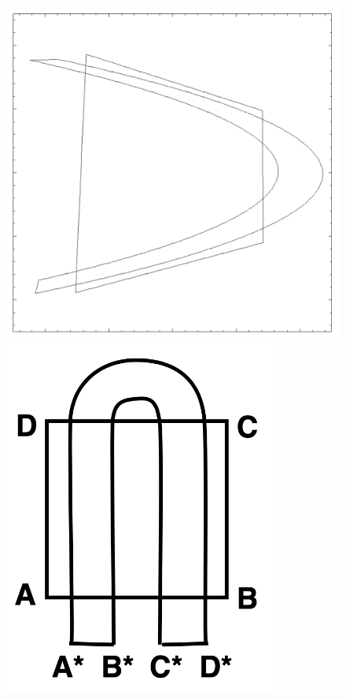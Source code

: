 \documentclass[12pt]{article}
\theoremstyle{plain}
\begin{document}
\begin{figure}[H]
\begin{minipage}[c][0.24\width]{
   0.24\textwidth}
   \centering
   \includegraphics[width=1\textwidth]{figure/section5/horseshoe-henon.png}
\end{minipage}
\begin{minipage}[c][0.24\width]{
   0.24\textwidth}
   \centering
   \includegraphics[width=0.8\textwidth]{figure/section5/horseshoe.png}

\end{minipage}
\end{figure}
\end{document}
